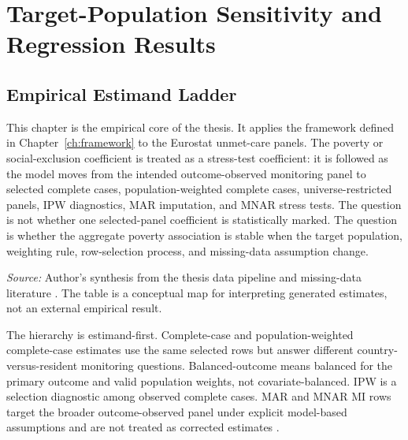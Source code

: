 \chapter{Target-Population Sensitivity and Regression Results}
\label{ch:modeling_strategy_results}

\section{Empirical Estimand Ladder}

This chapter is the empirical core of the thesis. It applies the framework defined in Chapter~\ref{ch:framework} to the Eurostat unmet-care panels. The poverty or social-exclusion coefficient is treated as a stress-test coefficient: it is followed as the model moves from the intended outcome-observed monitoring panel to selected complete cases, population-weighted complete cases, universe-restricted panels, IPW diagnostics, MAR imputation, and MNAR stress tests. The question is not whether one selected-panel coefficient is statistically marked. The question is whether the aggregate poverty association is stable when the target population, weighting rule, row-selection process, and missing-data assumption change.

\begin{table}[htbp]
\centering
\scriptsize
\caption{Target populations, assumptions, and interpretation of estimates. Row counts come from the generated thesis pipeline and distinguish the 608-row outcome-observed target from the 282-row complete-case FE sample.}
\label{tab:estimand_framework}

\vspace{0.25em}

\begin{minipage}{0.96\textwidth}
\scriptsize \textit{Source:} Author's synthesis from the thesis data pipeline and missing-data literature \citep{little_rubin_2019,seaman_white_2013}. The table is a conceptual map for interpreting generated estimates, not an external empirical result.
\end{minipage}
\end{table}

The hierarchy is estimand-first. Complete-case and population-weighted complete-case estimates use the same selected rows but answer different country-versus-resident monitoring questions. Balanced-outcome means balanced for the primary outcome and valid population weights, not covariate-balanced. IPW is a selection diagnostic among observed complete cases. MAR and MNAR MI rows target the broader outcome-observed panel under explicit model-based assumptions and are not treated as corrected estimates \citep{rubin_1987,little_rubin_2019}.

